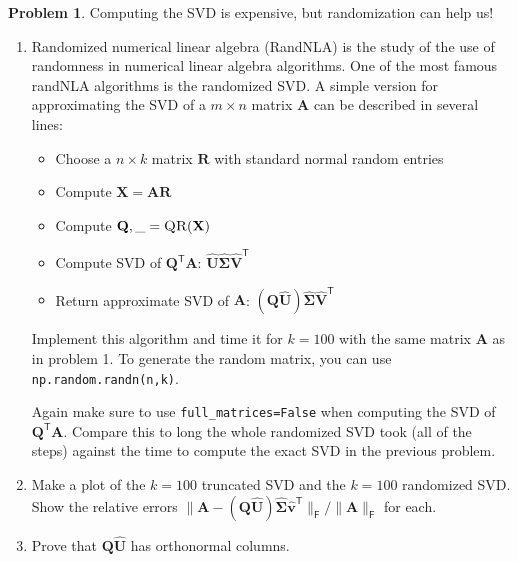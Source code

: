 \documentclass[12pt]{article}
\theoremstyle{definition}
\newtheorem{problem}{Problem}
\renewcommand{\vec}{\mathbf}
\newcommand{\T}{\mathsf{T}}
\newcommand{\F}{\mathsf{F}}
\begin{document}
\begin{problem}
    Computing the SVD is expensive, but randomization can help us!
    \begin{enumerate}
        \item Randomized numerical linear algebra (RandNLA) is the study of the use of randomness in numerical linear algebra algorithms. 
            One of the most famous randNLA algorithms is the randomized SVD.
            A simple version for approximating the SVD of a $m\times n$ matrix $\vec{A}$ can be described in several lines:
            \begin{itemize}
                \item Choose a $n\times k$ matrix $\vec{R}$ with standard normal random entries
                \item Compute $\vec{X} = \vec{A} \vec{R}$
                \item Compute $\vec{Q},\_ = \textsc{QR}(\vec{X})$
                \item Compute SVD of $\vec{Q}^\T \vec{A}$: $\hat{\vec{U}} \hat{\vec{\Sigma}} \hat{\vec{V}}^\T$
                \item Return approximate SVD of $\vec{A}$: $(\vec{Q} \hat{\vec{U}}) \hat{\vec{\Sigma}} \hat{\vec{V}}^\T$  
            \end{itemize}

            Implement this algorithm and time it for $k=100$ with the same matrix $\vec{A}$ as in problem 1.
            To generate the random matrix, you can use \lstinline{np.random.randn(n,k)}.


            Again make sure to use \lstinline{full_matrices=False} when computing the SVD of $\vec{Q}^\T \vec{A}$.
            Compare this to long the whole randomized SVD took (all of the steps) against the time to compute the exact SVD in the previous problem.
        
        \item 
            Make a plot of the $k=100$ truncated SVD and the $k=100$ randomized SVD.
            Show the relative errors $\|\vec{A} - (\vec{Q} \hat{\vec{U}})\hat{\vec{\Sigma}} \hat{\vec{v}}^\T \|_\F/\|\vec{A}\|_\F$ for each. 

        \item Prove that $\vec{Q}\hat{\vec{U}}$ has orthonormal columns.
    \end{enumerate}
\end{problem}
\end{document}
